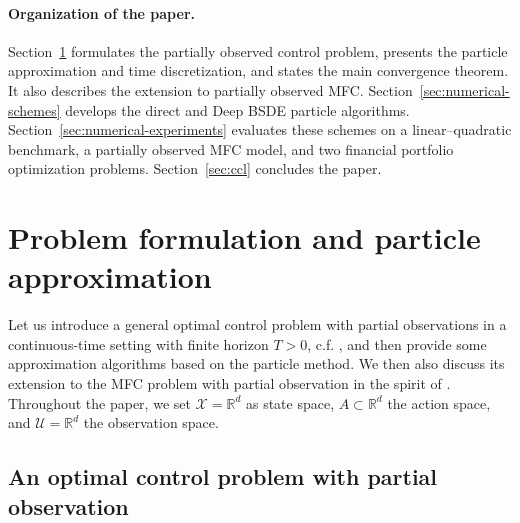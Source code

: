 \documentclass[11pt]{article}
\numberwithin{equation}{section}
\theoremstyle{plain}
\theoremstyle{definition}
\theoremstyle{remark}
\newcommand{\R}{\mathbb{R}}
\begin{document}
	\paragraph{Organization of the paper.}
	Section~\ref{sec:problem-approximation} formulates the partially observed control problem, presents the particle approximation and time discretization, and states the main convergence theorem. It also describes the extension to partially observed MFC. Section~\ref{sec:numerical-schemes} develops the direct and Deep BSDE particle algorithms. Section~\ref{sec:numerical-experiments} evaluates these schemes on a linear--quadratic benchmark, a partially observed MFC model, and two financial portfolio optimization problems. Section~\ref{sec:ccl} concludes the paper.
	
	
	\section{Problem formulation and particle approximation} \label{sec:problem-approximation}
	
	Let us introduce a general optimal control problem with partial observations in a continuous-time setting with finite horizon $T>0$, c.f. \cite{bensoussan1992stochastic},
	and then provide some approximation algorithms based on the particle method.
	We then also discuss its extension to the MFC problem with partial observation in the spirit of \cite{buckdahn2017mean}.
	Throughout the paper, we set $\mathcal{X}=\R^d$ as state space,  $A \subset \R^d$ the action space, and $\mathcal{U} = \R^d$ the observation space.
	
	\subsection{An optimal control problem with partial observation} \label{subsec:problem}
	
\end{document}
